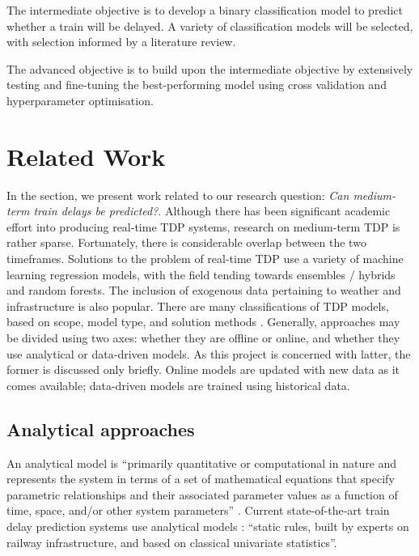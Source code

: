 \documentclass[12pt,a4paper]{article}
\begin{document}
The intermediate objective is to develop a binary classification model to predict whether a train will be delayed. A variety of classification models will be selected, with selection informed by a literature review.

The advanced objective is to build upon the intermediate objective by extensively testing and fine-tuning the best-performing model using cross validation and hyperparameter optimisation.

\section{Related Work}
\label{section:related_work}

In the section, we present work related to our research question: \textit{Can medium-term train delays be predicted?}. Although there has been significant academic effort into producing real-time TDP systems, research on medium-term TDP is rather sparse. Fortunately, there is considerable overlap between the two timeframes. Solutions to the problem of real-time TDP use a variety of machine learning regression models, with the field tending towards ensembles / hybrids  and random forests. The inclusion of exogenous data pertaining to weather and infrastructure is also popular.  There are many classifications of TDP models, based on scope, model type, and solution methods \cite{markovic_et_al_2015}. Generally, approaches may be divided using two axes: whether they are offline or online, and whether they use analytical or data-driven models. As this project is concerned with latter, the former is discussed only briefly. Online models are updated with new data as it comes available; data-driven models are trained using historical data.

\subsection{Analytical approaches}

An analytical model is “primarily quantitative or computational in nature and represents the system in terms of a set of mathematical equations that specify parametric relationships and their associated parameter values as a function of time, space, and/or other system parameters” \cite{friedenthal_moore_steiner_2012}. Current state-of-the-art train delay prediction systems use analytical models \cite{oneto_et_al_2016}: “static rules, built by experts on railway infrastructure, and based on classical univariate statistics”.
\end{document}
